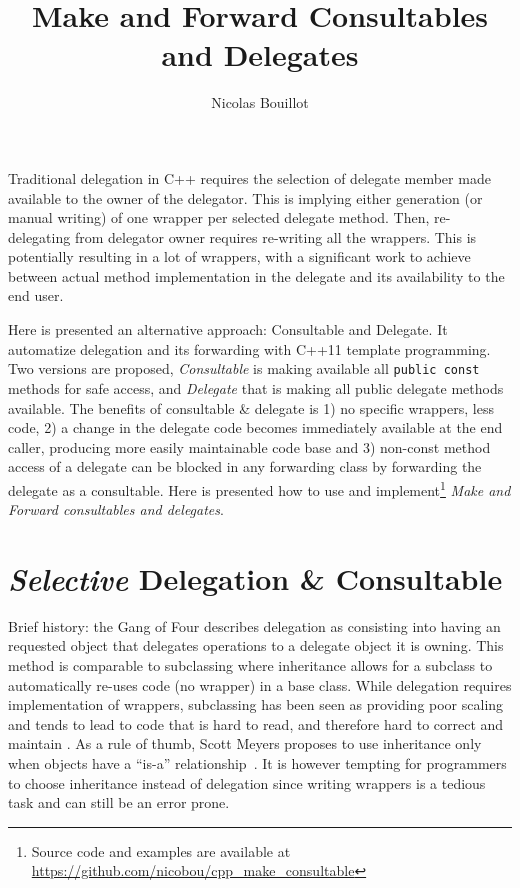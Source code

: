 \documentclass{article}
\begin{document}
\title{Make and Forward Consultables and Delegates}
\author{Nicolas Bouillot}
\maketitle

Traditional delegation in C++ requires the selection of delegate member made available to the owner of the delegator. This is implying either generation (or manual writing) of one wrapper per selected delegate method. Then, re-delegating from delegator owner requires re-writing all the wrappers. This is potentially resulting in a lot of wrappers, with a significant work to achieve between actual method implementation in the delegate and its availability to the end user. 

Here is presented an alternative approach: Consultable and Delegate. It automatize delegation and its forwarding with C++11 template programming. Two versions are proposed, \textit{Consultable} is making available all \verb+public const+ methods for safe access, and \textit{Delegate} that is making all public delegate methods available. The benefits of consultable \& delegate  is 1) no specific wrappers, less code, 2) a change in the delegate code becomes immediately available at the end caller, producing more easily maintainable code base and 3) non-const method access of a delegate can be blocked in any forwarding class by forwarding the delegate as a consultable. Here is presented how to use and implement\footnote{Source code and examples are available at\\ \url{https://github.com/nicobou/cpp_make_consultable}} \textit{Make and Forward consultables and delegates}.  

\section{\textit{Selective} Delegation \& Consultable}
Brief history: the Gang of Four\cite{1995gamma} describes delegation as consisting into having an requested object that delegates operations to a delegate object it is owning. This method is comparable to subclassing where inheritance allows for a subclass to automatically re-uses code (no wrapper) in a base class.  While delegation requires implementation of wrappers, subclassing has been seen as providing poor scaling and tends to lead to code that is hard to read, and therefore hard to correct and maintain \cite{2007cser}. As a rule of thumb, Scott Meyers proposes to use inheritance only when objects have a ``is-a'' relationship~\cite{2005Meyers}. It is however tempting for programmers to choose inheritance instead of delegation since writing wrappers is a tedious task and can still be an error prone.
\end{document}
